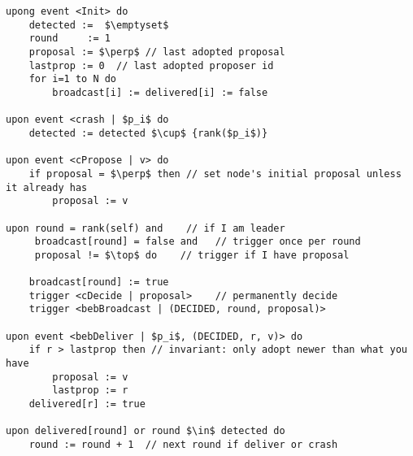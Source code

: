\begin{lstlisting}[caption={Hierachical consensus}, mathescape]
upong event <Init> do
    detected :=  $\emptyset$
    round     := 1
    proposal := $\perp$ // last adopted proposal
    lastprop := 0  // last adopted proposer id
    for i=1 to N do
        broadcast[i] := delivered[i] := false

upon event <crash | $p_i$ do
    detected := detected $\cup$ {rank($p_i$)}

upon event <cPropose | v> do
    if proposal = $\perp$ then // set node's initial proposal unless it already has
        proposal := v

upon round = rank(self) and    // if I am leader
     broadcast[round] = false and   // trigger once per round
     proposal != $\top$ do    // trigger if I have proposal

    broadcast[round] := true
    trigger <cDecide | proposal>    // permanently decide
    trigger <bebBroadcast | (DECIDED, round, proposal)>

upon event <bebDeliver | $p_i$, (DECIDED, r, v)> do
    if r > lastprop then // invariant: only adopt newer than what you have
        proposal := v
        lastprop := r
    delivered[r] := true

upon delivered[round] or round $\in$ detected do
    round := round + 1  // next round if deliver or crash
\end{lstlisting}
